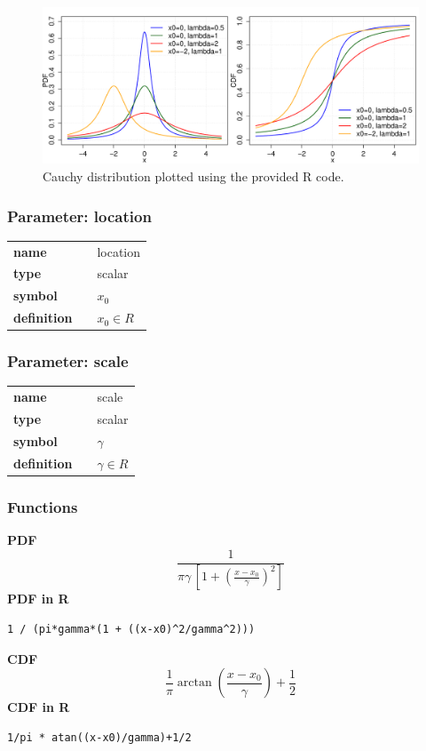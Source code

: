 \begin{figure}[ht!]
\centering
  \includegraphics[width=140mm]{pics/Cauchy.pdf}
 \caption{Cauchy distribution plotted using the provided R code.}
 \label{fig:Cauchy}
\end{figure}

\subsubsection*{Parameter: location}

\noindent\begin{tabular}{p{2cm}cl}
\textbf{name} & & location \\
\textbf{type} & & scalar \\
\textbf{symbol} & & $x_0$  \\
\textbf{definition} & & $x_0 \in  R$
\end{tabular}
\subsubsection*{Parameter: scale}

\noindent\begin{tabular}{p{2cm}cl}
\textbf{name} & & scale \\
\textbf{type} & & scalar \\
\textbf{symbol} & & $\gamma$  \\
\textbf{definition} & & $\gamma \in  R$
\end{tabular}
\subsubsection*{Functions}

\smallskip \noindent \hspace{.2cm} \textbf{PDF} 
\begin{equation*}\frac{1}{\pi\gamma\,\left[1 + \left(\frac{x-x_0}{\gamma}\right)^2\right]}\end{equation*}
\smallskip \noindent \hspace{.2cm} \textbf{PDF in R}  
\begin{verbatim}1 / (pi*gamma*(1 + ((x-x0)^2/gamma^2)))\end{verbatim}
\smallskip \noindent \hspace{.2cm} \textbf{CDF} 
\begin{equation*}\frac{1}{\pi} \arctan\left(\frac{x-x_0}{\gamma}\right)+\frac{1}{2}\end{equation*}
\smallskip \noindent \hspace{.2cm} \textbf{CDF in R} 
\begin{verbatim}1/pi * atan((x-x0)/gamma)+1/2\end{verbatim}
\smallskip
